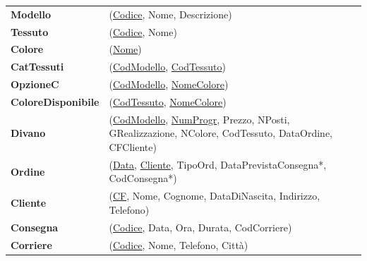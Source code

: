 \documentclass{article}
\begin{document}
\begin{tabular}{ll}
	\textbf{Modello} & (\underline{Codice}, Nome, Descrizione) \\
	
	\textbf{Tessuto} & (\underline{Codice}, Nome) \\
	
	\textbf{Colore} & (\underline{Nome}) \\
	
	\textbf{CatTessuti} & (\underline{CodModello}, \underline{CodTessuto}) \\
	
	\textbf{OpzioneC} & (\underline{CodModello}, \underline{NomeColore}) \\
	
	\textbf{ColoreDisponibile} & (\underline{CodTessuto}, \underline{NomeColore}) \\
	
	\textbf{Divano} & (\underline{CodModello}, \underline{NumProgr}, Prezzo, NPosti, GRealizzazione, NColore, CodTessuto, DataOrdine, CFCliente) \\
	
	\textbf{Ordine} & (\underline{Data}, \underline{Cliente}, TipoOrd, DataPrevistaConsegna*, CodConsegna*) \\
	
	\textbf{Cliente} & (\underline{CF}, Nome, Cognome, DataDiNascita, Indirizzo, Telefono) \\
	
	\textbf{Consegna} & (\underline{Codice}, Data, Ora, Durata, CodCorriere) \\
	
	\textbf{Corriere} & (\underline{Codice}, Nome, Telefono, Città) \\
\end{tabular}

\newpage
\end{document}
